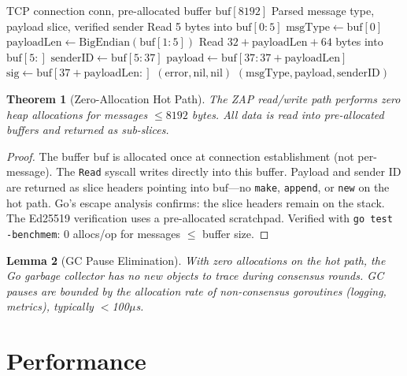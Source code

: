 \documentclass[11pt,letterpaper]{article}
\newtheorem{theorem}{Theorem}
\newtheorem{lemma}[theorem]{Lemma}
\begin{document}
\begin{algorithm}
\caption{ZAP Message Read (Zero-Allocation)}
\begin{algorithmic}[1]
\REQUIRE TCP connection $\text{conn}$, pre-allocated buffer $\text{buf}[8192]$
\ENSURE Parsed message type, payload slice, verified sender
\STATE Read 5 bytes into $\text{buf}[0:5]$ 
\STATE $\text{msgType} \leftarrow \text{buf}[0]$
\STATE $\text{payloadLen} \leftarrow \text{BigEndian}(\text{buf}[1:5])$
\STATE Read $32 + \text{payloadLen} + 64$ bytes into $\text{buf}[5:]$
\STATE $\text{senderID} \leftarrow \text{buf}[5:37]$ 
\STATE $\text{payload} \leftarrow \text{buf}[37:37+\text{payloadLen}]$ 
\STATE $\text{sig} \leftarrow \text{buf}[37+\text{payloadLen}:]$
    \RETURN $(\text{error}, \text{nil}, \text{nil})$
\ENDIF
\RETURN $(\text{msgType}, \text{payload}, \text{senderID})$
\end{algorithmic}
\end{algorithm}

\begin{theorem}[Zero-Allocation Hot Path]
The ZAP read/write path performs zero heap allocations for messages $\leq 8192$ bytes. All data is read into pre-allocated buffers and returned as sub-slices.
\end{theorem}

\begin{proof}
The buffer $\text{buf}$ is allocated once at connection establishment (not per-message). The \texttt{Read} syscall writes directly into this buffer. Payload and sender ID are returned as slice headers pointing into $\text{buf}$---no \texttt{make}, \texttt{append}, or \texttt{new} on the hot path. Go's escape analysis confirms: the slice headers remain on the stack. The Ed25519 verification uses a pre-allocated scratchpad. Verified with \texttt{go test -benchmem}: 0 allocs/op for messages $\leq$ buffer size.
\end{proof}

\begin{lemma}[GC Pause Elimination]
With zero allocations on the hot path, the Go garbage collector has no new objects to trace during consensus rounds. GC pauses are bounded by the allocation rate of non-consensus goroutines (logging, metrics), typically $<$100$\mu$s.
\end{lemma}

\section{Performance}
\end{document}
